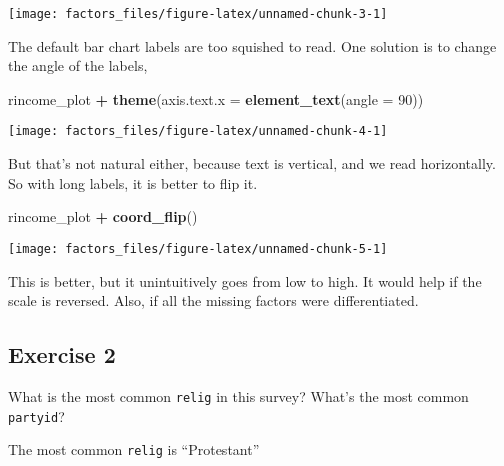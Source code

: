 \documentclass[]{book}
\newenvironment{Shaded}{\begin{snugshade}}{\end{snugshade}}
\newcommand{\CommentTok}[1]{\textcolor[rgb]{0.56,0.35,0.01}{\textit{#1}}}
\newcommand{\DataTypeTok}[1]{\textcolor[rgb]{0.13,0.29,0.53}{#1}}
\newcommand{\DecValTok}[1]{\textcolor[rgb]{0.00,0.00,0.81}{#1}}
\newcommand{\KeywordTok}[1]{\textcolor[rgb]{0.13,0.29,0.53}{\textbf{#1}}}
\newcommand{\NormalTok}[1]{#1}
\newcommand{\OperatorTok}[1]{\textcolor[rgb]{0.81,0.36,0.00}{\textbf{#1}}}
\newcommand{\StringTok}[1]{\textcolor[rgb]{0.31,0.60,0.02}{#1}}
\theoremstyle{plain}
\theoremstyle{remark}
\theoremstyle{definition}
\theoremstyle{definition}
\theoremstyle{definition}
\theoremstyle{remark}
\begin{document}
\begin{center}\texttt{[image: factors\_files/figure-latex/unnamed-chunk-3-1]} \end{center}

The default bar chart labels are too squished to read. One solution is
to change the angle of the labels,

\begin{Shaded}
\begin{Highlighting}[]
\NormalTok{rincome_plot }\OperatorTok{+}
\StringTok{  }\KeywordTok{theme}\NormalTok{(}\DataTypeTok{axis.text.x =} \KeywordTok{element_text}\NormalTok{(}\DataTypeTok{angle =} \DecValTok{90}\NormalTok{))}
\end{Highlighting}
\end{Shaded}

\begin{center}\texttt{[image: factors\_files/figure-latex/unnamed-chunk-4-1]} \end{center}

But that's not natural either, because text is vertical, and we read
horizontally. So with long labels, it is better to flip it.

\begin{Shaded}
\begin{Highlighting}[]
\NormalTok{rincome_plot }\OperatorTok{+}
\StringTok{  }\KeywordTok{coord_flip}\NormalTok{()}
\end{Highlighting}
\end{Shaded}

\begin{center}\texttt{[image: factors\_files/figure-latex/unnamed-chunk-5-1]} \end{center}

This is better, but it unintuitively goes from low to high. It would
help if the scale is reversed. Also, if all the missing factors were
differentiated.

\hypertarget{exercise-2-41}{%
\subsection{Exercise 2}\label{exercise-2-41}}

What is the most common \texttt{relig} in this survey? What's the most
common \texttt{partyid}?

The most common \texttt{relig} is ``Protestant''

\begin{Shaded}
\end{Shaded}
\end{document}
